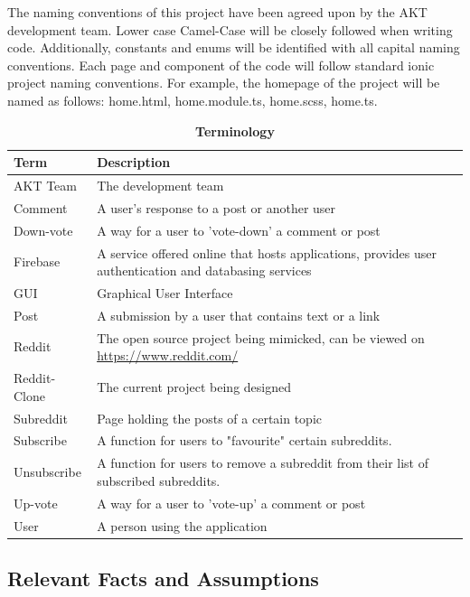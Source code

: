 \documentclass[12pt,fleqn]{article}
\begin{document}
The naming conventions of this project have been agreed upon by the AKT development team.  Lower case Camel-Case will be closely followed when writing code.  Additionally, constants and enums will be identified with all capital naming conventions.  Each page and component of the code will follow standard ionic project naming conventions. For example, the homepage of the project will be named as follows: home.html, home.module.ts, home.scss, home.ts. 

\begin{table}[H]
\caption{\bf Terminology }
\begin{tabularx}{\textwidth}{p{3cm}X}
\toprule {\bf Term} & {\bf Description}\\
\midrule
AKT Team & The development team \\
Comment & A user's response to a post or another user \\
Down-vote & A way for a user to 'vote-down' a comment or post \\
Firebase & A service offered online that hosts applications, provides user authentication and databasing services \\
GUI & Graphical User Interface \\
Post & A submission by a user that contains text or a link \\
Reddit & The open source project being mimicked, can be viewed on \href{https://www.reddit.com/}{https://www.reddit.com/} \\
Reddit-Clone & The current project being designed \\
Subreddit & Page holding the posts of a certain topic \\
Subscribe & A function for users to "favourite" certain subreddits. \\
Unsubscribe & A function for users to remove a subreddit from their list of subscribed subreddits. \\ 
Up-vote & A way for a user to 'vote-up' a comment or post \\
User & A person using the application \\
\bottomrule
\end{tabularx}
\end{table}

\subsection {Relevant Facts and Assumptions}
\end{document}
